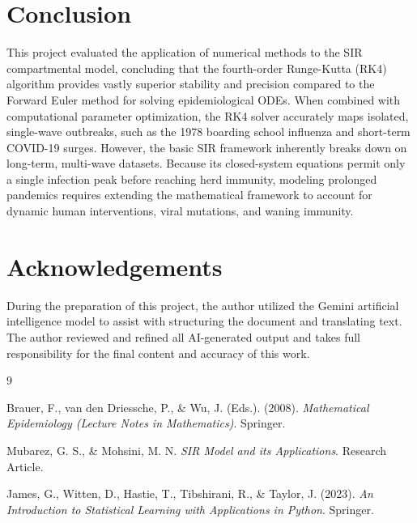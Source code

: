 \documentclass[12pt,a4paper]{article}
\begin{document}
\section{Conclusion}
This project evaluated the application of numerical methods to the SIR compartmental model, concluding that the fourth-order Runge-Kutta (RK4) algorithm provides vastly superior stability and precision compared to the Forward Euler method for solving epidemiological ODEs. When combined with computational parameter optimization, the RK4 solver accurately maps isolated, single-wave outbreaks, such as the 1978 boarding school influenza and short-term COVID-19 surges. However, the basic SIR framework inherently breaks down on long-term, multi-wave datasets. Because its closed-system equations permit only a single infection peak before reaching herd immunity, modeling prolonged pandemics requires extending the mathematical framework to account for dynamic human interventions, viral mutations, and waning immunity.


\section*{Acknowledgements}
During the preparation of this project, the author utilized the Gemini artificial intelligence model to assist with structuring the document and translating text. The author reviewed and refined all AI-generated output and takes full responsibility for the final content and accuracy of this work.

\begin{thebibliography}{9}

Brauer, F., van den Driessche, P., \& Wu, J. (Eds.). (2008). 
\textit{Mathematical Epidemiology (Lecture Notes in Mathematics)}. 
Springer.

Mubarez, G. S., \& Mohsini, M. N. 
\textit{SIR Model and its Applications}. 
Research Article.

James, G., Witten, D., Hastie, T., Tibshirani, R., \& Taylor, J. (2023). 
\textit{An Introduction to Statistical Learning with Applications in Python}. 
Springer.

\end{thebibliography}
\end{document}
